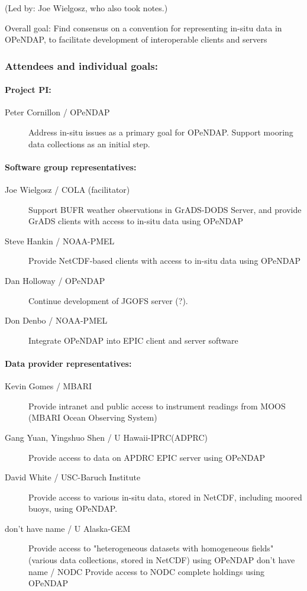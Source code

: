 (Led by: Joe Wielgosz, who also took notes.)

Overall goal:   Find consensus on a convention for representing in-situ 
data in OPeNDAP, to facilitate development of interoperable clients and 
servers

\subsubsection{Attendees and individual goals:}

\paragraph{Project PI:}

\begin{description}
\item[Peter Cornillon / OPeNDAP]
        Address in-situ issues as a primary goal for OPeNDAP. Support mooring 
data collections as an initial step.
\end{description}

\paragraph{Software group representatives:}

\begin{description}
\item[Joe Wielgosz / COLA (facilitator)] Support BUFR weather
  observations in GrADS-DODS Server, and provide GrADS clients with
  access to in-situ data using OPeNDAP
\item[Steve Hankin / NOAA-PMEL] Provide NetCDF-based clients with
  access to in-situ data using OPeNDAP
\item[Dan Holloway / OPeNDAP] Continue development of JGOFS server
  (?).
\item[Don Denbo / NOAA-PMEL] Integrate OPeNDAP into EPIC client and
  server software
\end{description}

\paragraph{Data provider representatives:}
\begin{description}
\item[Kevin Gomes / MBARI]
        Provide intranet and public access to instrument readings from MOOS 
(MBARI Ocean Observing System)
\item[Gang Yuan, Yingshuo Shen / U Hawaii-IPRC(ADPRC)] Provide access
  to data on APDRC EPIC server using OPeNDAP
\item[David White / USC-Baruch Institute] Provide access to various
  in-situ data, stored in NetCDF, including moored buoys, using
  OPeNDAP.
\item[don't have name / U Alaska-GEM] Provide access to
  "heterogeneous datasets with homogeneous fields" (various data
  collections, stored in NetCDF) using OPeNDAP don't have name / NODC
  Provide access to NODC complete holdings using OPeNDAP
\end{description}


